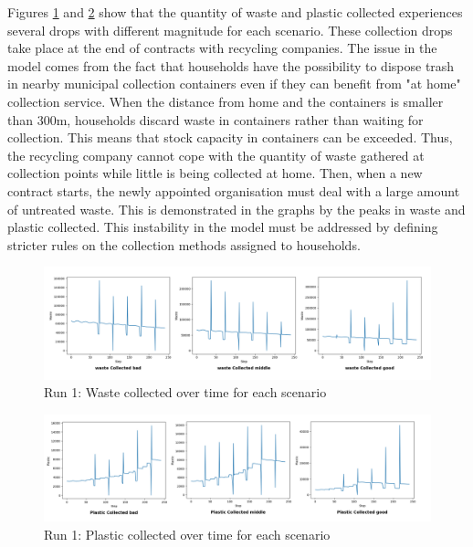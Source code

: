 \noindent Figures \ref{fig:Run 1 waste collected} and \ref{fig:Run 1 plastic collected} show that the quantity of waste and plastic collected experiences several drops with different magnitude for each scenario. These collection drops take place at the end of contracts with recycling companies. The issue in the model comes from the fact that households have the possibility to dispose trash in nearby municipal collection containers even if they can benefit from "at home" collection service. When the distance from home and the containers is smaller than 300m, households discard waste in containers rather than waiting for collection. This means that stock capacity in containers can be exceeded. Thus, the recycling company cannot cope with the quantity of waste gathered at collection points while little is being collected at home. Then, when a new contract starts, the newly appointed organisation must deal with a large amount of untreated waste. This is demonstrated in the graphs by the peaks in waste and plastic collected. This instability in the model must be addressed by defining stricter rules on the collection methods assigned to households.
\begin{figure}[H]
    \centering
        \captionsetup{width=\linewidth}
        \includegraphics[width=1.0\linewidth]{Images/Run 1 waste collected.png}
        \caption{Run 1: Waste collected over time for each scenario}
    \label{fig:Run 1 waste collected}
\end{figure}

\begin{figure}[H]
    \centering
        \captionsetup{width=\linewidth}
        \includegraphics[width=1.0\linewidth]{Images/Run 1 plastic collected.png}
        \caption{Run 1: Plastic collected over time for each scenario}
    \label{fig:Run 1 plastic collected}
\end{figure}

